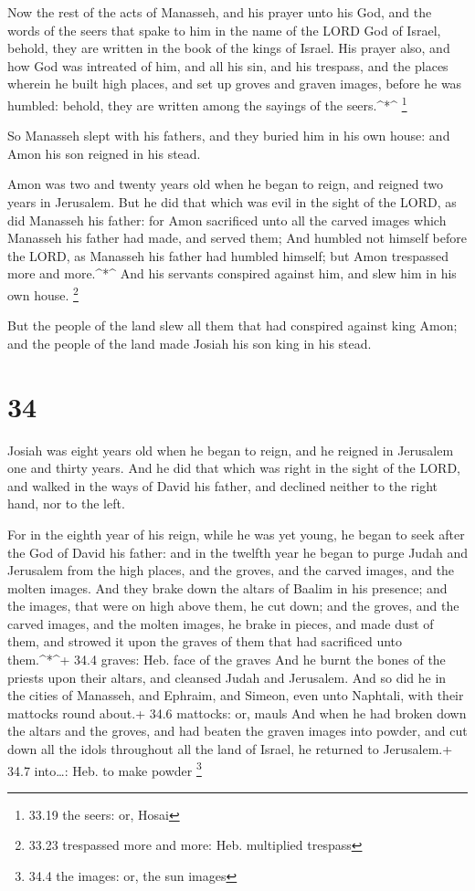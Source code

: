  Now the rest of the acts of Manasseh, and his prayer unto
his God, and the words of the seers that spake to him in the name of the
LORD God of Israel, behold, they are written in the book of the kings of
Israel.  His prayer also, and how God was intreated of him,
and all his sin, and his trespass, and the places wherein he built high
places, and set up groves and graven images, before he was humbled:
behold, they are written among the sayings of the seers.\^{}*\^{}
\footnote{33.19 the seers: or, Hosai}

 So Manasseh slept with his fathers, and they buried him in
his own house: and Amon his son reigned in his stead.

 Amon was two and twenty years old when he began to reign,
and reigned two years in Jerusalem.  But he did that which
was evil in the sight of the LORD, as did Manasseh his father: for Amon
sacrificed unto all the carved images which Manasseh his father had
made, and served them;  And humbled not himself before the
LORD, as Manasseh his father had humbled himself; but Amon trespassed
more and more.\^{}*\^{}  And his servants conspired against
him, and slew him in his own house. \footnote{33.23 trespassed more and
  more: Heb. multiplied trespass}

 But the people of the land slew all them that had
conspired against king Amon; and the people of the land made Josiah his
son king in his stead.

\hypertarget{section-33}{%
\section{34}\label{section-33}}

 Josiah was eight years old when he began to reign, and he
reigned in Jerusalem one and thirty years.  And he did that
which was right in the sight of the LORD, and walked in the ways of
David his father, and declined neither to the right hand, nor to the
left.

 For in the eighth year of his reign, while he was yet
young, he began to seek after the God of David his father: and in the
twelfth year he began to purge Judah and Jerusalem from the high places,
and the groves, and the carved images, and the molten images.
 And they brake down the altars of Baalim in his presence;
and the images, that were on high above them, he cut down; and the
groves, and the carved images, and the molten images, he brake in
pieces, and made dust of them, and strowed it upon the graves of them
that had sacrificed unto them.\^{}*\^{}+ 34.4 graves: Heb. face of the
graves  And he burnt the bones of the priests upon their
altars, and cleansed Judah and Jerusalem.  And so did he in
the cities of Manasseh, and Ephraim, and Simeon, even unto Naphtali,
with their mattocks round about.+ 34.6 mattocks: or, mauls 
And when he had broken down the altars and the groves, and had beaten
the graven images into powder, and cut down all the idols throughout all
the land of Israel, he returned to Jerusalem.+ 34.7 into\ldots: Heb. to
make powder \footnote{34.4 the images: or, the sun images}

